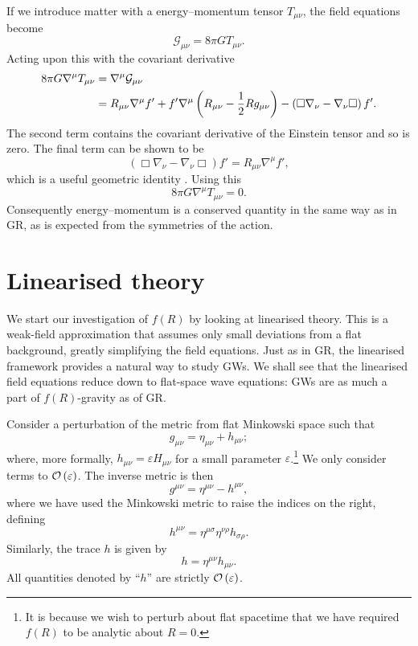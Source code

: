If we introduce matter with a energy--momentum tensor $T_{\mu\nu}$, the field equations become
\begin{equation}
\mathcal{G}_{\mu\nu} = 8\pi GT_{\mu\nu}.
\end{equation}
Acting upon this with the covariant derivative
\begin{align}
8\pi G\nabla^\mu T_{\mu\nu} = {} & \nabla^\mu\mathcal{G}_{\mu\nu} \nonumber \\*
 = {} & R_{\mu\nu}\nabla^\mu f' + f'\nabla^\mu\left(R_{\mu\nu} - \dfrac{1}{2}R g_{\mu\nu}\right) - \left(\Box\nabla_\nu - \nabla_\nu\Box\right)f'.
\end{align}
The second term contains the covariant derivative of the Einstein tensor and so is zero. The final term can be shown to be
\begin{equation}
\left(\Box\nabla_\nu - \nabla_\nu\Box\right)f' = R_{\mu\nu}\nabla^\mu f',
\end{equation}
which is a useful geometric identity \citep{Koivisto2006a}. Using this
\begin{equation}
8\pi G\nabla^\mu T_{\mu\nu} = 0.
\end{equation}
Consequently energy--momentum is a conserved quantity in the same way as in GR, as is expected from the symmetries of the action.

\section{Linearised theory}\label{sec:Lin}

We start our investigation of $f(R)$ by looking at linearised theory. This is a weak-field approximation that assumes only small deviations from a flat background, greatly simplifying the field equations. Just as in GR, the linearised framework provides a natural way to study GWs. We shall see that the linearised field equations reduce down to flat-space wave equations: GWs are as much a part of $f(R)$-gravity as of GR.

Consider a perturbation of the metric from flat Minkowski space such that
\begin{equation}
g_{\mu\nu} = \eta_{\mu\nu} + h_{\mu\nu};
\end{equation}
where, more formally, $h_{\mu\nu} = \varepsilon H_{\mu\nu}$ for a small parameter $\varepsilon$.\footnote{It is because we wish to perturb about flat spacetime that we have required $f(R)$ to be analytic about $R = 0$.} We only consider terms to $\mathcal{O}\left({\varepsilon}\right)$. The inverse metric is then
\begin{equation}
g^{\mu\nu} = \eta^{\mu\nu} - h^{\mu\nu},
\end{equation}
where we have used the Minkowski metric to raise the indices on the right, defining
\begin{equation}
h^{\mu\nu} = \eta^{\mu\sigma}\eta^{\nu\rho}h_{\sigma\rho}.
\end{equation}
Similarly, the trace $h$ is given by
\begin{equation}
h = \eta^{\mu\nu}h_{\mu\nu}.
\end{equation}
All quantities denoted by ``$h$'' are strictly $\mathcal{O}\left({\varepsilon}\right)$.

